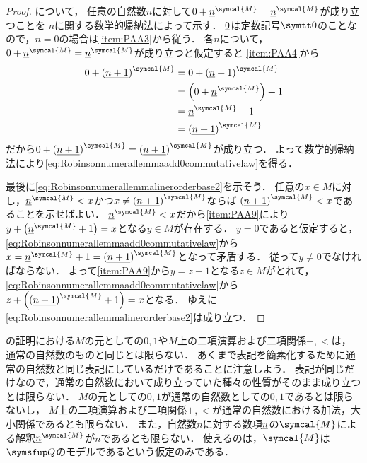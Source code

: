 \begin{proof}
	について，
	任意の自然数\(n\)に対して\(0 + \interpretation{\symcal{M}}{\numeral{n}} = \interpretation{\symcal{M}}{\numeral{n}}\)が成り立つことを
	\(n\)に関する数学的帰納法によって示す．
	\(\underline{0}\)は定数記号\(\obj{0}\)のことなので，\(n = 0\)の場合は\cref{item:PAA3}から従う．
	各\(n\)について，\(0 + \interpretation{\symcal{M}}{\numeral{n}} = \interpretation{\symcal{M}}{\numeral{n}}\)が成り立つと仮定すると
	\cref{item:PAA4}から
	\begin{align*}
		0 + \interpretation{\symcal{M}}{\paren{\numeral{n + 1}}}
		 & = 0 + \interpretation{\symcal{M}}{\paren{\numeral{n} + 1}} \\
		 & = \paren{0 + \interpretation{\symcal{M}}{\numeral{n}}} + 1 \\
		 & = \interpretation{\symcal{M}}{\numeral{n}} + 1             \\
		 & = \interpretation{\symcal{M}}{\paren{\numeral{n + 1}}}
	\end{align*}
	だから\(0 + \interpretation{\symcal{M}}{\paren{\numeral{n + 1}}} = \interpretation{\symcal{M}}{\paren{\numeral{n + 1}}}\)が成り立つ．
	よって数学的帰納法により\cref{eq:Robinsonnumerallemmaadd0commutativelaw}を得る．

	最後に\cref{eq:Robinsonnumerallemmalinerorderbase2}を示そう．
	任意の\(x \in M\)に対し，\(\interpretation{\symcal{M}}{\numeral{n}} < x\)かつ\(x \neq \interpretation{\symcal{M}}{\paren{\numeral{n + 1}}}\)ならば
	\(\interpretation{\symcal{M}}{\paren{\numeral{n + 1}}} < x\)であることを示せばよい．
	\(\interpretation{\symcal{M}}{\numeral{n}} < x\)だから\cref{item:PAA9}により
	\(y + \paren{\interpretation{\symcal{M}}{\numeral{n}} + 1} = x\)となる\(y \in M\)が存在する．
	\(y = 0\)であると仮定すると，\cref{eq:Robinsonnumerallemmaadd0commutativelaw}から
	\(x = \interpretation{\symcal{M}}{\numeral{n}} + 1 = \interpretation{\symcal{M}}{\paren{\numeral{n + 1}}}\)となって矛盾する．
	従って\(y \neq 0\)でなければならない．
	よって\cref{item:PAA9}から\(y = z + 1\)となる\(z \in M\)がとれて，
	\cref{eq:Robinsonnumerallemmaadd0commutativelaw}から\(z + \paren{\interpretation{\symcal{M}}{\paren{\numeral{n + 1}}} + 1} = x\)となる．
	ゆえに\cref{eq:Robinsonnumerallemmalinerorderbase2}は成り立つ．
\end{proof}

\begin{Note}
	の証明における\(M\)の元としての\(0, 1\)や\(M\)上の二項演算および二項関係\(+, <\)は，
	通常の自然数のものと同じとは限らない．
	あくまで表記を簡素化するために通常の自然数と同じ表記にしているだけであることに注意しよう．
	表記が同じだけなので，通常の自然数において成り立っていた種々の性質がそのまま成り立つとは限らない．
	\(M\)の元としての\(0,1\)が通常の自然数としての\(0,1\)であるとは限らないし，
	\(M\)上の二項演算および二項関係\(+, <\)が通常の自然数における加法，大小関係であるとも限らない．
	また，自然数\(n\)に対する数項\(\underline{n}\)の\(\symcal{M}\)による解釈\(\interpretation{\symcal{M}}{\numeral{n}}\)が\(n\)であるとも限らない．
	使えるのは，\(\symcal{M}\)は\(\Robinson\)のモデルであるという仮定のみである．
\end{Note}

